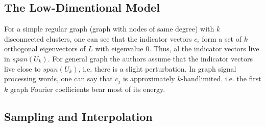 \documentclass[10pt,a4paper, nocenter]{report}
\theoremstyle{definition}
\begin{document}
	\subsection{The Low-Dimentional Model}
	For a simple regular graph (graph with nodes of same degree) with $k$ disconnected clusters, one can see that the indicator vectors ${c_i}$ form a set of $k$ orthogonal eigenvectors of $L$ with eigenvalue 0. Thus, al the indicator vectors live in $span(U_k)$. For general graph the authors assume that the indicator vectors live close to $span(U_k)$, i.e. there is a slight perturbation. In graph signal processing words, one can say that $c_j$ is approximately $k$-bandlimited. i.e. the first $k$ graph Fourier coefficients bear most of its energy. 
	\subsection{Sampling and Interpolation}
	

	\thispagestyle{fancy}
	
	 

	\nocite{Luxburg2007, govl:96, parlet:98, stsu:90, gene:2018}
\end{document}
